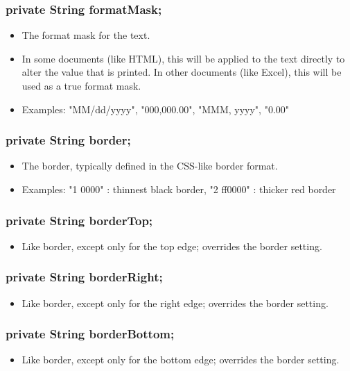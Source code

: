 \documentclass[letterpaper,10pt]{article}
\begin{document}
\subsubsection{private String formatMask;}
\begin{itemize}
 \item The format mask for the text.
 \item In some documents (like HTML), this will be applied to the text directly
 to alter the value that is printed. In other documents (like Excel), this
 will be used as a true format mask.
 \item Examples: "MM/dd/yyyy", "000,000.00", "MMM, yyyy", "0.00"
\end{itemize}

\subsubsection{private String border;}
\begin{itemize}
 \item The border, typically defined in the CSS-like border format.
 \item Examples: "1 0000" : thinnest black border, "2 ff0000" : thicker red border
\end{itemize}

\subsubsection{private String borderTop;}
\begin{itemize}
 \item Like border, except only for the top edge; overrides the border setting.
\end{itemize}

\subsubsection{private String borderRight;}
\begin{itemize}
 \item Like border, except only for the right edge; overrides the border setting.
\end{itemize}

\subsubsection{private String borderBottom;}
\begin{itemize}
 \item Like border, except only for the bottom edge; overrides the border setting.
\end{itemize}
\end{document}
